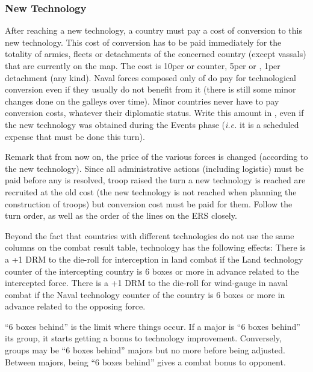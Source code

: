 \subsubsection{New Technology}
 After reaching a new technology, a country
must pay a cost of conversion to this new technology.
\bparag This cost of conversion has to be paid immediately for the totality of
armies, fleets or detachments of the concerned country (except vassals) that
are currently on the map.
\bparag The cost is 10\ducats per \ARMY\faceplus or \FLEET\faceplus counter,
5\ducats per \ARMY\facemoins or \FLEET\facemoins, 1\ducats per detachment (any
kind).
\bparag Naval forces composed only of \NGD do pay for technological
conversion even if they usually do not benefit from it (there is still some
minor changes done on the galleys over time).
\bparag Minor countries never have to pay conversion costs, whatever their
diplomatic status.
\bparag Write this amount in , even if the new
technology was obtained during the Events phase (\emph{i.e.} it is a scheduled
expense that must be done this turn).

\aparag Remark that from now on, the price of the various forces is changed
(according to the new technology).
\bparag Since all administrative actions (including logistic) must be paid
before any is resolved, troop raised the turn a new technology is reached are
recruited at the old cost (the new technology is not reached when planning the
construction of troops) but conversion cost must be paid for them. Follow the
turn order, as well as the order of the lines on the ERS closely.

 Beyond the fact that countries with different
technologies do not use the same columns on the combat result table,
technology has the following effects:
\bparag There is a +1 DRM to the die-roll for interception in land combat if
the Land technology counter of the intercepting country is 6 boxes or more in
advance related to the intercepted force.
\bparag There is a +1 DRM to the die-roll for wind-gauge in naval combat if
the Naval technology counter of the country is 6 boxes or more in advance
related to the opposing force.

\begin{playtip}
  ``6 boxes behind'' is the limit where things occur. If a major is ``6 boxes
  behind'' its group, it starts getting a bonus to technology
  improvement. Conversely, groups may be ``6 boxes behind'' majors but no more
  before being adjusted. Between majors, being ``6 boxes behind'' gives a
  combat bonus to opponent.
\end{playtip}


